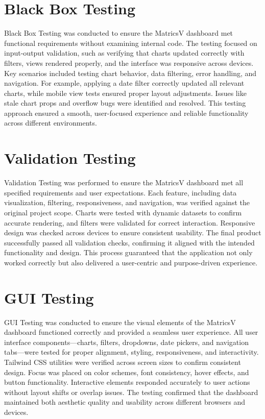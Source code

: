 \section{Black Box Testing}
Black Box Testing was conducted to ensure the MatricsV dashboard met functional requirements without examining internal code. The testing focused on input-output validation, such as verifying that charts updated correctly with filters, views rendered properly, and the interface was responsive across devices. Key scenarios included testing chart behavior, data filtering, error handling, and navigation. For example, applying a date filter correctly updated all relevant charts, while mobile view tests ensured proper layout adjustments. Issues like stale chart props and overflow bugs were identified and resolved. This testing approach ensured a smooth, user-focused experience and reliable functionality across different environments.




\section{Validation Testing}
Validation Testing was performed to ensure the MatricsV dashboard met all specified requirements and user expectations. Each feature, including data visualization, filtering, responsiveness, and navigation, was verified against the original project scope. Charts were tested with dynamic datasets to confirm accurate rendering, and filters were validated for correct interaction. Responsive design was checked across devices to ensure consistent usability. The final product successfully passed all validation checks, confirming it aligned with the intended functionality and design. This process guaranteed that the application not only worked correctly but also delivered a user-centric and purpose-driven experience.


\section{GUI Testing}
GUI Testing was conducted to ensure the visual elements of the MatricsV dashboard functioned correctly and provided a seamless user experience. All user interface components—charts, filters, dropdowns, date pickers, and navigation tabs—were tested for proper alignment, styling, responsiveness, and interactivity. Tailwind CSS utilities were verified across screen sizes to confirm consistent design. Focus was placed on color schemes, font consistency, hover effects, and button functionality. Interactive elements responded accurately to user actions without layout shifts or overlap issues. The testing confirmed that the dashboard maintained both aesthetic quality and usability across different browsers and devices.



